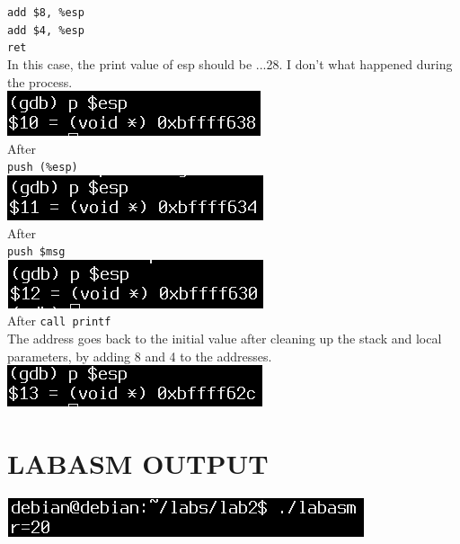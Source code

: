 \documentclass{article}
\begin{document}
\verb|add $8, %esp| \\
\verb|add $4, %esp| \\
\verb|ret| \\
In this case, the print value of esp should be ...28. I don't what happened during the process. \\
\includegraphics[scale = 0.6]{pesp2.png} \\
\noindent{\color{red}\rule{\linewidth}{0.5mm}}
After \\
\verb|push (%esp)| \\
\includegraphics[scale = 0.6]{pesp3.png} \\
\noindent{\color{red}\rule{\linewidth}{0.5mm}}
After \\
\verb|push $msg| \\
\includegraphics[scale = 0.6]{pesp4.png} \\
\noindent{\color{red}\rule{\linewidth}{0.5mm}}
After
\verb|call printf| \\ 
The address goes back to the initial value after cleaning up the stack and local parameters, by adding 8 and 4 to the addresses. \\
\includegraphics[scale = 0.6]{pesp5.png} \\
\noindent{\color{red}\rule{\linewidth}{0.5mm}}

\section*{LABASM OUTPUT}
\includegraphics[scale = 0.6]{labasmout.png} \\
\end{document}
